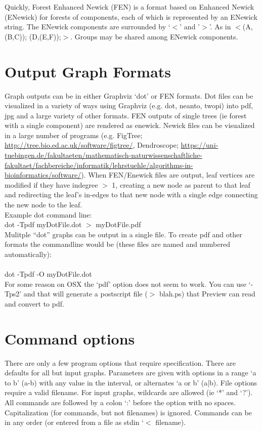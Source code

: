 \documentclass[11pt]{article}
\begin{document}
	Quickly, Forest Enhanced Newick (FEN) is a format based on Enhanced Newick (ENewick) for forests of components, each
	of which is represented by an ENewick string.  The ENewick components are surrounded by `$<$' and '$>$'.
	As in $<$(A, (B,C)); (D,(E,F));$>$.  Groups may be shared among ENewick components.
	
	
	\section{Output Graph Formats}
	Graph outputs can be in either Graphviz `dot' or FEN formats.  Dot files can be visualized in a variety of ways 
	using Graphviz (e.g. dot, neanto, twopi) into pdf, jpg and a large variety of other formats. FEN outputs of 
	single trees (ie forest with a single component) are rendered as enewick.  Newick files can be visualized in a 
	large number of programs (e.g. FigTree; \url{http://tree.bio.ed.ac.uk/software/figtree/}, Dendroscope; 
	\url{https://uni-tuebingen.de/fakultaeten/mathematisch-naturwissenschaftliche-fakultaet/fachbereiche/informatik/lehrstuehle/algorithms-in-bioinformatics/software/}). 	
	When FEN/Enewick files are output, leaf vertices are modified if they have indegree $>$ 1, creating a new node as parent to that leaf
	and redirecting the leaf's in-edges to that new node with a single edge connecting the new node to the leaf.  
	\bigskip
	\\Example dot command line: \\dot -Tpdf myDotFile.dot $>$ myDotFile.pdf\\
	
	Mulitple ``dot'' graphs can be output in a single file.  To create pdf and 
	other formats the commandline would be (these files are named and numbered automatically):\\\\dot -Tpdf -O myDotFile.dot\\
	
	For some reason on OSX the `pdf' option does not seem to work.  You can use `-Tps2' and that will generate a postscript file ($>$ blah.ps) that Preview can read and convert to pdf.
	
	\section{Command options}
	There are only a few program options that require specification.  There are defaults for all but input graphs.  
	Parameters are given with options in a range `a to b' (a-b) with any value in the interval, or alternates `a or b' (a|b). File options require a valid filename.
	For input graphs, wildcards are allowed (ie `*' and `?').  All commands are followed by a colon `:' before the option with no spaces.  Capitalization (for commands, but not filenames) is ignored.  Commands can be in any order (or entered from a file as stdin `$<$ filename).
	
\end{document}
